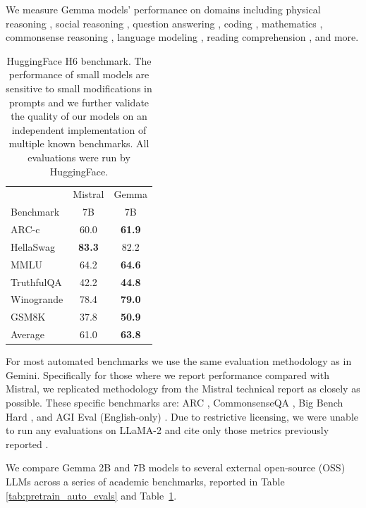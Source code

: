\documentclass[11pt, a4paper, logo, twocolumn, copyright, nonumbering]{googledeepmind}
\begin{document}
We measure Gemma models' performance on domains including physical reasoning \citep{piqa}, social reasoning \citep{siqa}, question answering \citep{boolq,natural-questions}, coding \citep{mbpp,humaneval}, mathematics \citep{gsm8k}, commonsense reasoning \citep{winogrande}, language modeling \citep{lambada}, reading comprehension \citep{triviaqa}, and more. 

\begin{table}[ht]
    \centering
    \begin{tabular}{l c c}
    \toprule
         &  Mistral & Gemma\\
Benchmark   &  7B & 7B \\
      \midrule
ARC-c     &   60.0 & \textbf{61.9}\\
HellaSwag &   \textbf{83.3} & 82.2  \\
MMLU      &   64.2 & \textbf{64.6}\\
TruthfulQA &   42.2 & \textbf{44.8} \\
Winogrande &   78.4 &  \textbf{79.0} \\
GSM8K      &   37.8 & \textbf{50.9}   \\
\midrule
Average &  61.0 & \textbf{63.8} \\
\bottomrule
\end{tabular}
    \caption{HuggingFace H6 benchmark. 
    The performance of small models are sensitive to small modifications in prompts and we further validate the quality of our models on an independent implementation of multiple known benchmarks. All evaluations were run by HuggingFace.}
    \label{tab:pretrain_auto_evals_gemini_caption}
\end{table}

For most automated benchmarks we use the same evaluation methodology as in Gemini. Specifically for those where we report performance compared with Mistral, we replicated methodology from the Mistral technical report as closely as possible. These specific benchmarks are: ARC \citep{arc}, CommonsenseQA \citep{commonsenseqa},  Big Bench Hard \citep{bbhard}, and AGI Eval (English-only) \citep{zhong2023agieval}. Due to restrictive licensing, we were unable to run any evaluations on LLaMA-2 and cite only those metrics previously reported \citep{llama2}.

We compare Gemma 2B and 7B models to several external open-source (OSS) LLMs across a series of academic benchmarks, reported in Table \ref{tab:pretrain_auto_evals} and Table~\ref{tab:pretrain_auto_evals_gemini_caption}.
\end{document}
